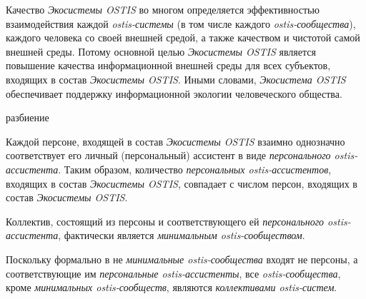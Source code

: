 Качество \textit{Экосистемы OSTIS} во многом определяется эффективностью взаимодействия каждой \textit{ostis-системы} (в том числе каждого \textit{ostis-сообщества}), каждого человека со своей внешней средой, а также качеством и чистотой самой внешней среды. 
Потому основной целью \textit{Экосистемы OSTIS} является повышение качества информационной внешней среды для всех субъектов, входящих в состав \textit{Экосистемы OSTIS}.
Иными словами, \textit{Экосистема OSTIS} обеспечивает поддержку информационной экологии человеческого общества.

\begin{SCn}
\begin{scnrelfromset}{разбиение}
\end{scnrelfromset}
\end{SCn}

Каждой персоне, входящей в состав \textit{Экосистемы OSTIS} взаимно однозначно соответствует его личный (персональный) ассистент в виде \textit{персонального ostis-ассистента}.
Таким образом, количество \textit{персональных ostis-ассистентов}, входящих в состав \textit{Экосистемы OSTIS}, совпадает с числом персон, входящих в состав \textit{Экосистемы OSTIS}.


Коллектив, состоящий из персоны и соответствующего ей \textit{персонального ostis-ассистента}, фактически является \textit{минимальным ostis-сообществом}.


Поскольку формально в не \textit{минимальные ostis-сообщества} входят не персоны, а соответствующие им \textit{персональные ostis-ассистенты}, все \textit{ostis-сообщества}, кроме \textit{минимальных ostis-сообществ}, являются \textit{коллективами ostis-систем}.

